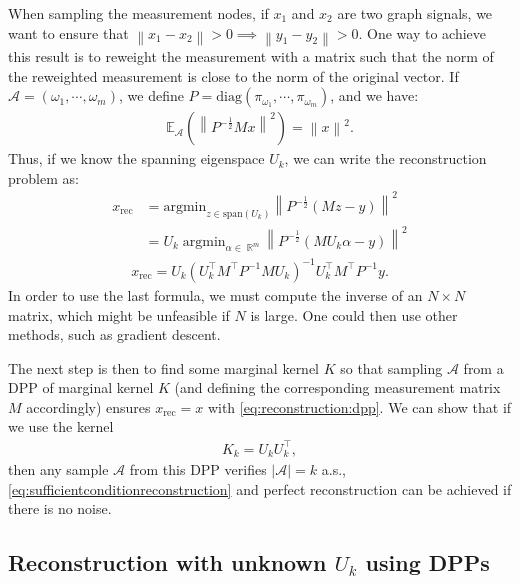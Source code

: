 \documentclass{article}
\newcommand{\abs} [1] {\left| #1 \right|}
\newcommand{\norm}[1]{\left\|#1\right\|}
\DeclareMathOperator{\R}{\mathbb{R}}
\begin{document}
When sampling the measurement nodes, if $x_1$ and $x_2$ are two graph signals, we want to ensure that $\norm{x_1 - x_2} > 0 \implies \norm{y_1 - y_2} > 0$. One way to achieve this result is to reweight the measurement with a matrix such that the norm of the reweighted measurement is close to the norm of the original vector. If $\mathcal{A} = (\omega_1, \cdots, \omega_m)$, we define $P = \mathrm{diag}(\pi_{\omega_1}, \cdots, \pi_{\omega_m})$, and we have:
\begin{align} \mathbb{E}_\mathcal{A} \left( \norm{P^{-\frac{1}{2}} M x}^2 \right) = \norm{x}^2. \label{eq:esp_reweighted_norm}\end{align}
Thus, if we know the spanning eigenspace $U_k$, we can write the reconstruction problem as:
\begin{align*} x_{\text{rec}} &= \mathrm{argmin}_{z \in \mathrm{span}(U_k)} \norm{P^{-\frac{1}{2}} \left( M z - y \right)}^2 \\
&= U_k \; \mathrm{argmin}_{\alpha \in \R^m} \norm{P^{-\frac{1}{2}} \left( M U_k \alpha - y \right)}^2 \end{align*}
\begin{align} \boxed{x_\text{rec} = U_k (U_k^\top M^\top P^{-1} M U_k)^{-1} U_k^\top M^\top P^{-1} y}. \label{eq:reconstruction:dpp} \end{align}
In order to use the last formula, we must compute the inverse of an $N \times N$ matrix, which might be unfeasible if $N$ is large. One could then use other methods, such as gradient descent.


The next step is then to find some marginal kernel $K$ so that sampling $\mathcal{A}$ from a DPP of marginal kernel $K$ (and defining the corresponding measurement matrix $M$ accordingly) ensures $x_\text{rec} = x$ with \eqref{eq:reconstruction:dpp}. We can show that if we use the kernel 
\begin{align} \boxed{K_k = U_k U_k^\top}, \label{eq:def:Kk}\end{align}
then any sample $\mathcal{A}$ from this DPP verifies $\abs{\mathcal{A}} = k$ a.s., \eqref{eq:sufficientconditionreconstruction} and perfect reconstruction can be achieved if there is no noise.


\subsection[Reconstruction with unknown Uk using DPPs]{Reconstruction with unknown $U_k$ using DPPs}
\end{document}
